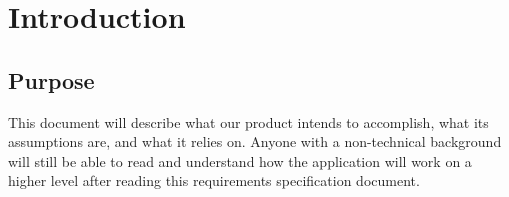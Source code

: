 \documentclass[english]{article}
\begin{document}
\vspace*{\fill} 
\vspace*{\fill} 

\newpage

\tableofcontents

\newpage

\setcounter{page}{1}
\raggedright

\section{Introduction}
\label{sec:introduction}

\subsection{Purpose}
\label{sub:purpose}
This document will describe what our product intends to accomplish, what its assumptions are, and what it relies on. Anyone with a non-technical background will still be able to read and understand how the application will work on a higher level after reading this requirements specification document.
\end{document}
